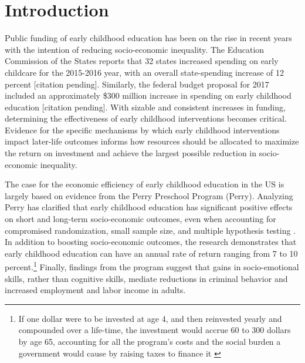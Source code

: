 \singlespacing
\pagebreak
\tableofcontents
\listoffigures
\listoftables
\pagebreak

\section{Introduction}

Public funding of early childhood education has been on the rise in recent years with the intention of reducing socio-economic inequality. The Education Commission of the States reports that 32 states increased spending on early childcare for the 2015-2016 year, with an overall state-spending increase of 12 percent [citation pending]. Similarly, the federal budget proposal for 2017 included an approximately \$300 million increase in spending on early childhood education [citation pending]. With sizable and consistent increases in funding, determining the effectiveness of early childhood interventions becomes critical. Evidence for the specific mechanisms by which early childhood interventions impact later-life outcomes informs how resources should be allocated to maximize the return on investment and achieve the largest possible reduction in socio-economic inequality. 

The case for the economic efficiency of early childhood education in the US is largely based on evidence from the Perry Preschool Program (Perry). Analyzing Perry has clarified that early childhood education has significant positive effects on short and long-term socio-economic outcomes, even when accounting for compromised randomization, small sample size, and multiple hypothesis testing \citep{Heckman_Moon_etal_2010_QE}. In addition to boosting socio-economic outcomes, the research demonstrates that early childhood education can have an annual rate of return ranging from 7 to 10 percent.\footnote{If one dollar were to be invested at age 4, and then reinvested yearly and compounded over a life-time, the investment would accrue 60 to 300 dollars by age 65, accounting for all the program's costs and the social burden a government would cause by raising taxes to finance it \citep{Heckman_Moon_etal_2010_RateofReturn}} Finally, findings from the program suggest that gains in socio-emotional skills, rather than cognitive skills, mediate reductions in criminal behavior and increased employment and labor income in adults\citep{Heckman_Pinto_etal_2013_PerryFactor}.


